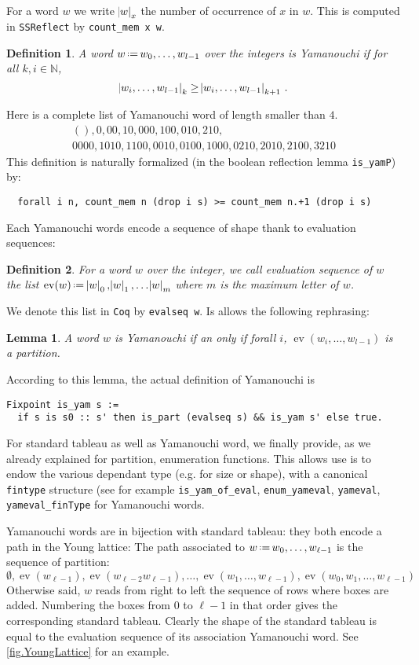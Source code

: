 \documentclass[12pt]{article}
\let\verb=\lstinline
\newcommand{\Coq}{\texttt{Coq}\xspace}
\newcommand{\SSR}{\texttt{SSReflect}\xspace}
\newcommand{\N}{{\mathbb N}}
\newcommand{\evseq}{\operatorname{ev}}
\newcommand{\eqdef}{\mbox{\,\raisebox{0.2ex}{\scriptsize\ensuremath{\mathrm:}}\ensuremath{=}\,}} %
\newtheorem{LEMMA}{Lemma}
\newtheorem{DEFN}{Definition}
\begin{document}
For a word $w$ we write $\abs{w}_x$ the number of occurrence of $x$ in
$w$. This is computed in \SSR by \verb{count_mem x w}.
\begin{DEFN}
  A word $w\eqdef w_0,\dots,w_{l-1}$ over the integers is \emph{Yamanouchi} if for
  all $k, i \in \N$,
  \[ \abs{w_i,\dots,w_{l-1}}_k \geq \abs{w_i,\dots,w_{l-1}}_{k+1}\,. \]
\end{DEFN}
Here is a complete list of Yamanouchi word of length smaller than $4$.
\begin{gather*}
  (), 0, 00, 10, 000, 100, 010, 210, \\
  0000, 1010, 1100, 0010, 0100, 1000, 0210, 2010, 2100, 3210
\end{gather*}
This definition is naturally formalized (in the boolean reflection lemma
\verb|is_yamP|) by:
\begin{lstlisting}
  forall i n, count_mem n (drop i s) >= count_mem n.+1 (drop i s)
\end{lstlisting}
Each Yamanouchi words encode a sequence of shape thank to evaluation sequences:
\begin{DEFN}
  For a word $w$ over the integer, we call \emph{evaluation sequence} of $w$
  the list $\evseq(w)\eqdef\abs{w}_0,\abs{w}_1,\dots\abs{w}_m$ where $m$ is
  the maximum letter of $w$.
\end{DEFN}
We denote this list in \Coq by \verb{evalseq w}. Is allows the following
rephrasing:
\begin{LEMMA}
  A word $w$ is Yamanouchi if an only if forall $i$, $\evseq(w_i,\dots,w_{l-1})$ is a partition.
\end{LEMMA}
According to this lemma, the actual definition of Yamanouchi is
\begin{lstlisting}
Fixpoint is_yam s :=
  if s is s0 :: s' then is_part (evalseq s) && is_yam s' else true.
\end{lstlisting}
For standard tableau as well as Yamanouchi word, we finally provide, as we
already explained for partition, enumeration functions. This allows use is to
endow the various dependant type (e.g. for size or shape), with a canonical
\verb{fintype} structure (see for example \verb{is_yam_of_eval},
\verb{enum_yameval}, \verb{yameval}, \verb{yameval_finType} for
Yamanouchi words.

Yamanouchi words are in bijection with standard tableau: they both encode a
path in the Young lattice: The path associated to $w\eqdef w_0,\dots,w_{\ell-1}$
is the sequence of partition:
\begin{equation}
  \emptyset, \evseq(w_{\ell-1}), \evseq(w_{\ell-2}w_{\ell-1}),\dots,
  \evseq(w_1,\dots,w_{\ell-1}), \evseq(w_0,w_1,\dots,w_{\ell-1})
\end{equation}
Otherwise said, $w$ reads from right to left the sequence of rows where boxes
are added. Numbering the boxes from $0$ to $\ell-1$ in that order gives the
corresponding standard tableau. Clearly the shape of the standard tableau is
equal to the evaluation sequence of its association Yamanouchi word. See
\cref{fig.YoungLattice} for an example.
\end{document}
